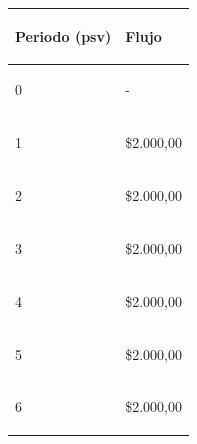 \begin{spacing}{0.1}
\begin{center}
\begin{tabular}{ |p{3.5cm}| p{3cm}|}
\hline 

\begin{center}\textbf{Periodo (psv) } \end{center}  & \begin{center} \textbf{Flujo} \end{center}  \\ \hline

\begin{center} 0 \end{center}   &  \begin{center} - \end{center}\\\hline

\begin{center}1 \end{center}    &  \begin{center} \$2.000,00\end{center} \\ \hline

\begin{center}2 \end{center}    &  \begin{center} \$2.000,00\end{center} \\ \hline 

\begin{center}3 \end{center}    & \begin{center} \$2.000,00 \end{center}  \\ \hline

\begin{center}4 \end{center}    & \begin{center} \$2.000,00 \end{center}  \\ \hline

\begin{center}5 \end{center}    & \begin{center} \$2.000,00 \end{center}  \\ \hline

\begin{center}6 \end{center}    & \begin{center} \$2.000,00 \end{center}  \\ \hline


\end{tabular}
\end{center}
\end{spacing}
